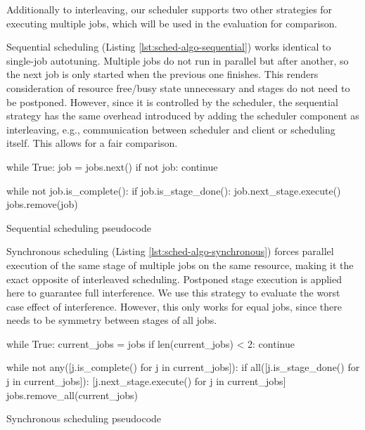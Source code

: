 Additionally to interleaving, our scheduler supports two other strategies for executing multiple jobs, which will be used in the evaluation for comparison.

Sequential scheduling (Listing \ref{lst:sched-algo-sequential}) works identical to single-job autotuning. Multiple jobs do not run in parallel but after another, so the next job is only started when the previous one finishes. This renders consideration of resource free/busy state unnecessary and stages do not need to be postponed. However, since it is controlled by the scheduler, the sequential strategy has the same overhead introduced by adding the scheduler component as interleaving, e.g., communication between scheduler and client or scheduling itself. This allows for a fair comparison.

\begin{listing}[t]
\begin{pythoncode}
while True:
    job = jobs.next()
    if not job:
        continue

    while not job.is_complete():
        if job.is_stage_done():
            job.next_stage.execute()
    jobs.remove(job)
\end{pythoncode}
\unskip
\caption{Sequential scheduling pseudocode}
\label{lst:sched-algo-sequential}
\end{listing}

Synchronous scheduling (Listing \ref{lst:sched-algo-synchronous}) forces parallel execution of the same stage of multiple jobs on the same resource, making it the exact opposite of interleaved scheduling. Postponed stage execution is applied here to guarantee full interference. We use this strategy to evaluate the worst case effect of interference. However, this only works for equal jobs, since there needs to be symmetry between stages of all jobs.

\begin{listing}[t]
\begin{pythoncode}
while True:
    current_jobs = jobs
    if len(current_jobs) < 2:
        continue

    while not any([j.is_complete() for j in current_jobs]):
        if all([j.is_stage_done() for j in current_jobs]):
            [j.next_stage.execute() for j in current_jobs]
    jobs.remove_all(current_jobs)
\end{pythoncode}
\unskip
\caption{Synchronous scheduling pseudocode}
\label{lst:sched-algo-synchronous}
\end{listing}

